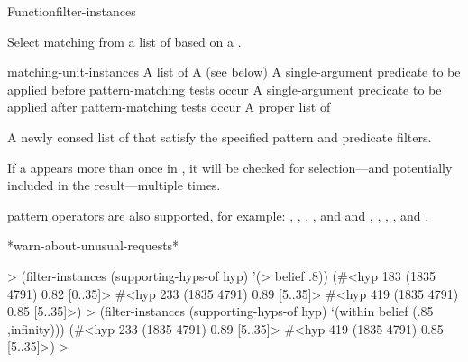 \documentclass[10pt,twoside,english,pdftex]{article}
\begin{document}
\begin{functiondoc}{Function}{filter-instances}%
  {
     
    \returns{} }
%
%
%

\fnsyntax

\fnpurpose Select matching  from a list of
 based on a .

\fnpackage {}

\fnmodule {}

\fnargs
\begin{args}{matching-unit-instances}
 A list of 
\arg[pattern] A  (see below)
 A single-argument predicate to be applied before
pattern-matching tests occur
 A single-argument predicate to be
applied after pattern-matching tests occur
 A proper list of 
\end{args}

%
%
\fnreturns A newly consed list of  that satisfy
the specified pattern and predicate filters.

\fndsyntax
\W\supp\tabletop
\patternspec{}

\fnterms
\W\supp\tabletop
\patternterms

\fndescription If a  appears more than once in
, it will be checked for selection---and potentially
included in the result---multiple times.

 pattern operators are also
supported, for example: \code{=\&}, \code{=\$\&}, \code{=\$}, \code{=\$\$},
and \code{=\$\$\$} and , , ,
, and .

\begin{alsos}{*warn-about-unusual-requests*}
\end{alsos}

\fnexamples
%
\W\supp
\begin{example}
  > (filter-instances (supporting-hyps-of hyp) '(> belief .8))
  (#<hyp 183 (1835 4791) 0.82 [0..35]>
   #<hyp 233 (1835 4791) 0.89 [5..35]>
   #<hyp 419 (1835 4791) 0.85 [5..35]>)\goodpagebreak
  > (filter-instances (supporting-hyps-of hyp) `(within belief (.85 ,infinity)))
  (#<hyp 233 (1835 4791) 0.89 [5..35]>
   #<hyp 419 (1835 4791) 0.85 [5..35]>)
  >
\end{example}

\end{functiondoc}
\end{document}
